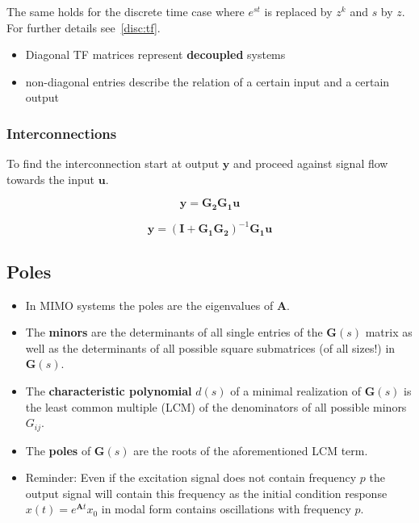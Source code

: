 
The same holds for the discrete time case where $e^{st}$ is replaced by $z^k$ and $s$ by $z$. For further details see~\ref{disc:tf}.

\newpar{}
\begin{itemize}
    \item Diagonal TF matrices represent \textbf{decoupled} systems
    \item non-diagonal entries describe the relation of a certain input and a certain output
\end{itemize}

\subsubsection{Interconnections}

To find the interconnection start at output $\mathbf{y}$ and proceed against signal flow towards the input $\mathbf{u}$.

\newpar{}
\newpar{}
\begin{center}
    
\end{center}

\begin{equation*}
    \mathbf{y}=\mathbf{G_2G_1u}
\end{equation*}

\newpar{}
\newpar{}
\begin{center}
    
\end{center}

\begin{equation*}
    \mathbf{y}={(\mathbf{I}+\mathbf{G_1G_2})}^{-1}\mathbf{G_1u}
\end{equation*}


\subsection{Poles}

\begin{itemize}
    \item In MIMO systems the poles are the eigenvalues of $\mathbf{A}$.
    \item The \textbf{minors} are the determinants of all single entries of the $\mathbf{G}(s)$ matrix as well as the determinants of all possible square submatrices (of all sizes!) in $\mathbf{G}(s)$.
    \item The \textbf{characteristic polynomial} $d(s)$ of a minimal realization of $\mathbf{G}(s)$ is the least common multiple (LCM) of the denominators of all possible minors $G_{ij}$.
    \item The \textbf{poles} of $\mathbf{G}(s)$ are the roots of the aforementioned LCM term.
    \item Reminder: Even if the excitation signal does not contain frequency $p$ the output signal will contain this frequency as the initial condition response $x(t) = e^{\mathbf{A}t}x_0$ in modal form contains oscillations with frequency $p$.
\end{itemize}

